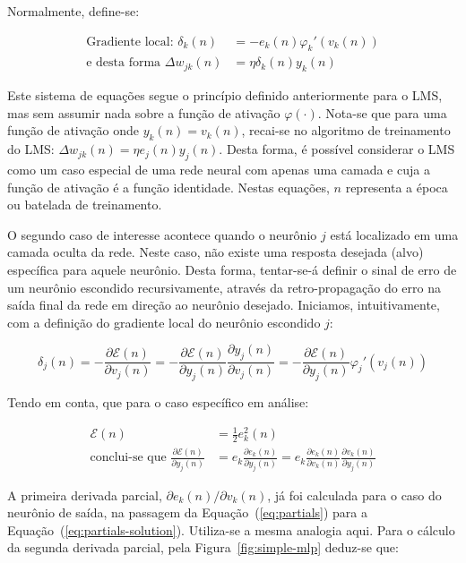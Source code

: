 Normalmente, define-se:

\begin{align}
\text{Gradiente local: } \delta_k(n) &= - e_k(n)\varphi_{k}'(v_k(n)) \\
\text{e desta forma } \Delta w_{jk}(n) &= \eta\delta_k(n)y_{k}(n)
\label{eq:neural-train}
\end{align}

Este sistema de equações segue o princípio definido anteriormente para o LMS,
mas sem assumir nada sobre a função de ativação $\varphi(\cdot)$. Nota-se que
para uma função de ativação onde $y_k(n) = v_k(n)$, recai-se no algoritmo de
treinamento do LMS: $\Delta w_{jk}(n) = \eta e_{j}(n)y_{j}(n)$. Desta forma, é
possível considerar o LMS como um caso especial de uma rede neural com apenas
uma camada e cuja a função de ativação é a função identidade. Nestas equações,
$n$ representa a época ou batelada de treinamento.

O segundo caso de interesse acontece quando o neurônio $j$ está localizado em
uma camada oculta da rede. Neste caso, não existe uma resposta desejada (alvo)
específica para aquele neurônio. Desta forma, tentar-se-á definir o sinal de
erro de um neurônio escondido recursivamente, através da retro-propagação do
erro na saída final da rede em direção ao neurônio desejado. Iniciamos,
intuitivamente, com a definição do gradiente local do neurônio escondido $j$:

\begin{equation}
\delta_j(n) = -\frac{\partial\mathcal{E}(n)}{\partial
v_j(n)} = -\frac{\partial\mathcal{E}(n)}{\partial
y_j(n)}\frac{\partial y_j(n)}{\partial v_j(n)} =
-\frac{\partial\mathcal{E}(n)}{\partial y_j(n)}\varphi_{j}'(v_j(n))
\end{equation}

Tendo em conta, que para o caso específico em análise:

\begin{align}
\mathcal{E}(n) &= \frac{1}{2}e_{k}^{2}(n) \\
\text{conclui-se que } \frac{\partial\mathcal{E}(n)}{\partial y_j(n)} &=
e_{k}\frac{\partial e_k(n)}{\partial y_j(n)} = e_{k}\frac{\partial
e_k(n)}{\partial v_k(n)}\frac{\partial v_k(n)}{\partial y_j(n)}
\end{align}

A primeira derivada parcial, $\partial e_k(n)/\partial v_k(n)$, já foi
calculada para o caso do neurônio de saída, na passagem da
Equação~(\ref{eq:partials}) para a
Equação~(\ref{eq:partials-solution}). Utiliza-se a mesma analogia aqui. Para o
cálculo da segunda derivada parcial, pela Figura~\ref{fig:simple-mlp}
deduz-se que:

